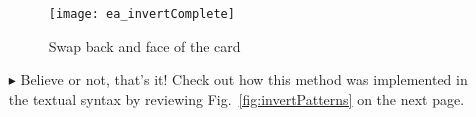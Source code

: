 \begin{itemize}
\begin{figure}[htbp]
\begin{center}
  \texttt{[image: ea\_invertComplete]}
  \caption{Swap back and face of the card}  
  \label{fig:sdm_invertComplete}
\end{center}
\end{figure}

\vspace{0.5cm}

\item[$\blacktriangleright$] Believe or not, that's it! Check out how this method was implemented in the textual syntax by reviewing
Fig.~\ref{fig:invertPatterns} on the next page.


\end{itemize}

